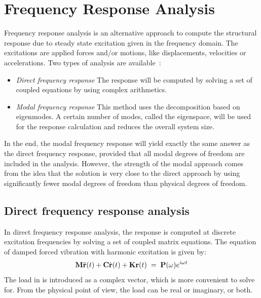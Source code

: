 %
%

%
%

\def\eiot{e^{i\omega t}}
\clearpage

\section{Frequency Response Analysis}
\label{s:Frequency Response Analysis}

Frequency response analysis is an alternative approach to compute the structural
response due to steady state excitation given in the frequency domain.
The excitations are applied forces and/or motions,
like displacements, velocities or accelerations.
Two types of analysis are available~\cite{Brincker}:
%
\begin{itemize}
%
\item{\it Direct frequency response} \mdash The response will be computed
by solving a set of coupled equations by using complex arithmetics.
%
\item{\it Modal frequency response} \mdash This method uses the decomposition
based on eigenmodes. A certain number of modes, called the eigenspace,
will be used for the response calculation and reduces the overall system size.
%
\end{itemize}
%
In the end, the modal frequency response will yield exactly the same answer as
the direct frequency response, provided that all modal degrees of freedom are
included in the analysis. However, the strength of the modal approach comes from
the idea that the solution is very close to the direct approach by using
significantly fewer modal degrees of freedom than physical degrees of freedom.

\subsection{Direct frequency response analysis}
\label{subs:Direct frequency response analysis}

In direct frequency response analysis, the response is computed at discrete
excitation frequencies by solving a set of coupled matrix equations.
The equation of damped forced vibration with harmonic excitation is given by:
%
\begin{equation}
\label{eq:fra0}
{\mf M}\ddot{\mf r}(t) + {\mf C}\dot{\mf r}(t) + {\mf K}{\mf r}(t) \;=\;
{\mf P}(\omega)\eiot
\end{equation}
%
The load in  is introduced as a complex vector,
which is more convenient to solve for. From the physical point of view,
the load can be real or imaginary, or both.

